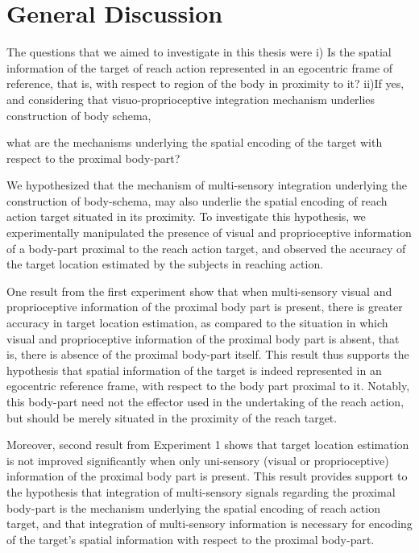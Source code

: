 \chapter{General Discussion} 
\label{discussion} 


The questions that we aimed to investigate in this thesis were i) Is the spatial information of the target of reach action represented in an egocentric frame of reference, that is, with respect to region of the body in proximity to it? ii)If yes, and considering that visuo-proprioceptive integration mechanism underlies construction of body schema, 


what are the mechanisms underlying the spatial encoding of the target with respect to the proximal body-part?

We hypothesized that the mechanism of multi-sensory integration underlying the construction of body-schema, may also underlie the spatial encoding of reach action target situated in its proximity. To investigate this hypothesis, we experimentally manipulated the presence of visual and proprioceptive information of a body-part proximal to the reach action target, and observed the accuracy of the target location estimated by the subjects in reaching action. 

One result from the first experiment show that when multi-sensory visual and proprioceptive information of the proximal body part is present, there is greater accuracy in target location estimation, as compared to the situation in which visual and proprioceptive information of the proximal body part is absent, that is, there is absence of the proximal body-part itself. This result thus supports the hypothesis that spatial information of the target is indeed represented in an egocentric reference frame, with respect to the body part proximal to it. Notably, this body-part need not the effector used in the undertaking of the reach action, but should be merely situated in the proximity of the reach target. %

Moreover, second result from Experiment 1 shows that target location estimation is not improved significantly when only uni-sensory (visual or proprioceptive) information of the proximal body part is present. This result provides support to the hypothesis that integration of multi-sensory signals regarding the proximal body-part is the mechanism underlying the spatial encoding of reach action target, and that integration of multi-sensory information is necessary for encoding of the target's spatial information with respect to the proximal body-part.

